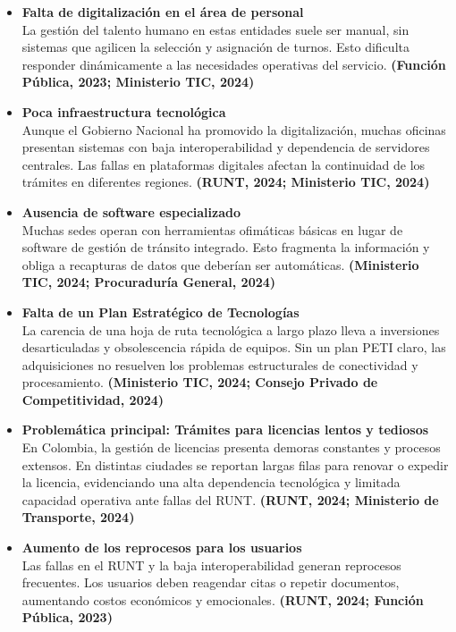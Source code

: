 \begin{itemize}
\item \textbf{Falta de digitalización en el área de personal} \\
La gestión del talento humano en estas entidades suele ser manual, sin sistemas que agilicen la selección y asignación de turnos. Esto dificulta responder dinámicamente a las necesidades operativas del servicio.  
\textbf{(Función Pública, 2023; Ministerio TIC, 2024)}

\item \textbf{Poca infraestructura tecnológica} \\
Aunque el Gobierno Nacional ha promovido la digitalización, muchas oficinas presentan sistemas con baja interoperabilidad y dependencia de servidores centrales. Las fallas en plataformas digitales afectan la continuidad de los trámites en diferentes regiones.  
\textbf{(RUNT, 2024; Ministerio TIC, 2024)}

\item \textbf{Ausencia de software especializado} \\
Muchas sedes operan con herramientas ofimáticas básicas en lugar de software de gestión de tránsito integrado. Esto fragmenta la información y obliga a recapturas de datos que deberían ser automáticas.  
\textbf{(Ministerio TIC, 2024; Procuraduría General, 2024)}

\item \textbf{Falta de un Plan Estratégico de Tecnologías} \\
La carencia de una hoja de ruta tecnológica a largo plazo lleva a inversiones desarticuladas y obsolescencia rápida de equipos. Sin un plan PETI claro, las adquisiciones no resuelven los problemas estructurales de conectividad y procesamiento.  
\textbf{(Ministerio TIC, 2024; Consejo Privado de Competitividad, 2024)}

\item \textbf{Problemática principal: Trámites para licencias lentos y tediosos} \\
En Colombia, la gestión de licencias presenta demoras constantes y procesos extensos. En distintas ciudades se reportan largas filas para renovar o expedir la licencia, evidenciando una alta dependencia tecnológica y limitada capacidad operativa ante fallas del RUNT.  
\textbf{(RUNT, 2024; Ministerio de Transporte, 2024)}

\item \textbf{Aumento de los reprocesos para los usuarios} \\
Las fallas en el RUNT y la baja interoperabilidad generan reprocesos frecuentes. Los usuarios deben reagendar citas o repetir documentos, aumentando costos económicos y emocionales.  
\textbf{(RUNT, 2024; Función Pública, 2023)}


\end{itemize}
